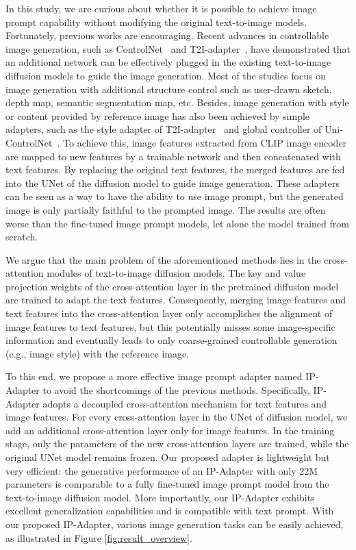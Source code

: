 \documentclass{article}
\begin{document}
In this study, we are curious about whether it is possible to achieve image prompt capability without modifying the original text-to-image models. Fortunately, previous works are encouraging. Recent advances in controllable image generation, such as ControlNet~\cite{zhang2023adding} and T2I-adapter~\cite{mou2023t2i}, have demonstrated that an additional network can be effectively plugged in the existing text-to-image diffusion models to guide the image generation. Most of the studies focus on image generation with additional structure control such as user-drawn sketch, depth map, semantic segmentation map, etc. Besides, image generation with style or content provided by reference image has also been achieved by simple adapters, such as the style adapter of T2I-adapter~\cite{mou2023t2i} and global controller of Uni-ControlNet~\cite{zhao2023uni}. To achieve this, image features extracted from CLIP image encoder are mapped to new features by a trainable network and then concatenated with text features. By replacing the original text features, the merged features are fed into the UNet of the diffusion model to guide image generation. These adapters can be seen as a way to have the ability to use image prompt, but the generated image is only partially faithful to the prompted image. The results are often worse than the fine-tuned image prompt models, let alone the model trained from scratch.

We argue that the main problem of the aforementioned methods lies in the cross-attention modules of text-to-image diffusion models. The key and value projection weights of the cross-attention layer in the pretrained diffusion model are trained to adapt the text features. Consequently, merging image features and text features into the cross-attention layer only accomplishes the alignment of image features to text features, but this potentially misses some image-specific information and eventually leads to only coarse-grained controllable generation (e.g., image style) with the reference image.

To this end, we propose a more effective image prompt adapter named IP-Adapter to avoid the shortcomings of the previous methods. Specifically, IP-Adapter adopts a decoupled cross-attention mechanism for text features and image features. For every cross-attention layer in the UNet of diffusion model, we add an additional cross-attention layer only for image features. In the training stage, only the parameters of the new cross-attention layers are trained, while the original UNet model remains frozen. Our proposed adapter is lightweight but very efficient: the generative performance of an IP-Adapter with only 22M parameters is comparable to a fully fine-tuned image prompt model from the text-to-image diffusion model. More importantly, our IP-Adapter exhibits excellent generalization capabilities and is compatible with text prompt. With our proposed IP-Adapter, various image generation tasks can be easily achieved, as illustrated in Figure \ref{fig:result_overview}.
\end{document}
